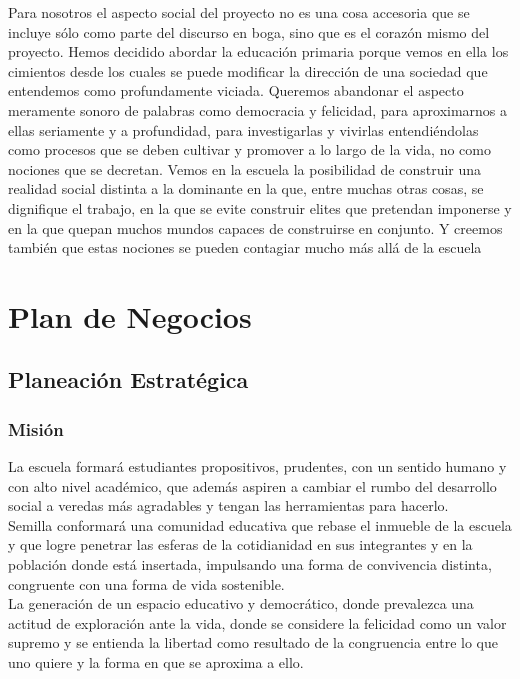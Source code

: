 \documentclass[10pt,letterpaper,oneside]{book}
\begin{document}
Para nosotros el aspecto social del proyecto no es una cosa accesoria que se incluye sólo como parte del discurso en boga, sino que es el corazón mismo del proyecto. Hemos decidido abordar la educación primaria porque vemos en ella los cimientos desde los cuales se puede modificar la dirección de una sociedad que entendemos como profundamente viciada. Queremos abandonar el aspecto meramente sonoro de palabras como democracia y felicidad, para aproximarnos a ellas seriamente y a profundidad, para investigarlas y vivirlas entendiéndolas como procesos que se deben cultivar y promover a lo largo de la vida, no como nociones que se decretan. Vemos en la escuela la posibilidad de construir una realidad social distinta a la dominante en la que, entre muchas otras cosas, se dignifique el trabajo, en la que se evite construir elites que pretendan imponerse y en la que quepan muchos mundos capaces de construirse en conjunto. Y creemos también que estas nociones se pueden contagiar mucho más allá de la escuela


\chapter{Plan de Negocios}

\section{Planeación Estratégica}
\subsection*{Misión}
La escuela formará estudiantes propositivos, prudentes, con un sentido humano y con alto nivel académico, que además aspiren a cambiar el rumbo del desarrollo social a veredas más agradables y tengan las herramientas para hacerlo.
\\
Semilla conformará una comunidad educativa que rebase el inmueble de la escuela y que logre penetrar las esferas de la cotidianidad en sus integrantes y en la población donde está insertada, impulsando una forma de convivencia distinta, congruente con una forma de vida sostenible.
\\
La generación de un espacio educativo y democrático, donde prevalezca una actitud de exploración ante la vida, donde se considere la felicidad como un valor supremo y se entienda la libertad como resultado de la congruencia entre lo que uno quiere y la forma en que se aproxima a ello.
\end{document}
